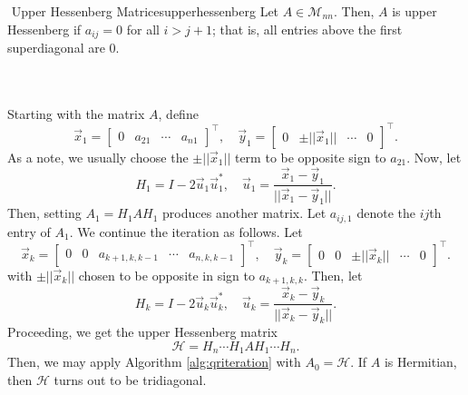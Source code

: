         \begin{definition}{\Stop\,\,Upper Hessenberg Matrices}{upperhessenberg}
            Let \(A\in\mathcal{M}_{nn}\). Then, \(A\) is upper Hessenberg if \(a_{ij}=0\) for all \(i>j+1\); that is, all entries above the first superdiagonal are \(0\).
        \end{definition}
        \pagebreak
        \vphantom
        \\
        \\
        Starting with the matrix \(A\), define
        \begin{equation*}
            \vec{x}_1=\begin{bmatrix}
                0 & a_{21} & \cdots & a_{n1}
            \end{bmatrix}^\top,\quad \vec{y}_1=\begin{bmatrix}
                0 & \pm ||\vec{x}_1|| & \cdots & 0
            \end{bmatrix}^\top.
        \end{equation*}
        As a note, we usually choose the \(\pm ||\vec{x}_1||\) term to be opposite sign to \(a_{21}\). Now, let
        \begin{equation*}
            H_1=I-2\vec{u}_1\vec{u}_1^*,\quad \vec{u}_1=\frac{\vec{x}_1-\vec{y}_1}{||\vec{x}_1-\vec{y}_1||}.
        \end{equation*}
        Then, setting \(A_1=H_1AH_1\) produces another matrix. Let \(a_{ij,1}\) denote the \(ij\)th entry of \(A_1\). We continue the iteration as follows. Let
        \begin{equation*}
            \vec{x}_{k}=\begin{bmatrix}
                0 & 0 & a_{k+1,k,k-1} & \cdots & a_{n,k,k-1}
            \end{bmatrix}^\top,\quad \vec{y}_{k}=\begin{bmatrix}
                0 & 0 & \pm ||\vec{x}_{k}|| & \cdots & 0
            \end{bmatrix}^\top.
        \end{equation*}
        with \(\pm ||\vec{x}_k||\) chosen to be opposite in sign to \(a_{k+1,k,k}\). Then, let
        \begin{equation*}
            H_k=I-2\vec{u}_k\vec{u}_k^*,\quad \vec{u}_k=\frac{\vec{x}_k-\vec{y}_k}{||\vec{x}_k-\vec{y}_k||}.
        \end{equation*}
        Proceeding, we get the upper Hessenberg matrix
        \begin{equation*}
            \mathcal{H}=H_{n}\cdots H_1 A H_1\cdots H_{n}.
        \end{equation*}
        Then, we may apply Algorithm \ref{alg:qriteration} with \(A_0=\mathcal{H}\). If \(A\) is Hermitian, then \(\mathcal{H}\) turns out to be tridiagonal.

